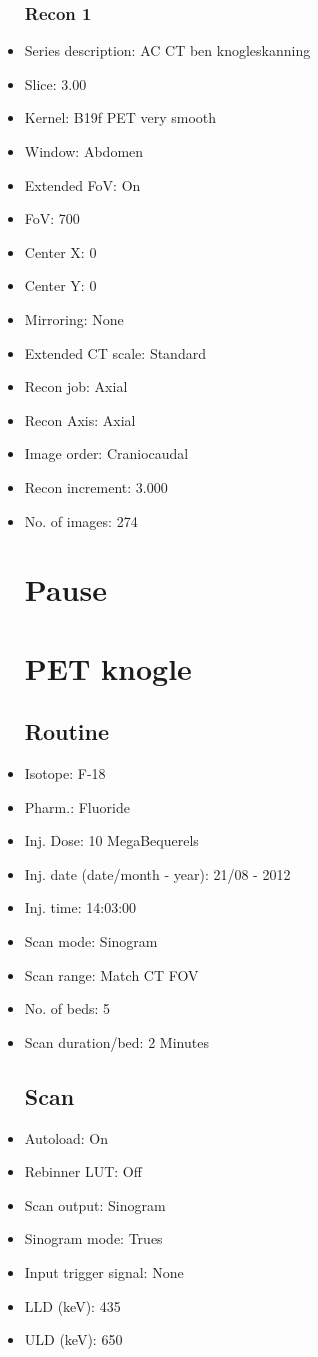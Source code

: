 \documentclass[12pt]{article}
\begin{document}
\begin{itemize}
\subsubsection{Recon 1}
\item Series description: AC CT  ben  knogleskanning
\item Slice: 3.00
\item Kernel: B19f PET very smooth
\item Window: Abdomen
\item Extended FoV: On
\item FoV: 700
\item Center X: 0
\item Center Y: 0
\item Mirroring: None
\item Extended CT scale: Standard
\item Recon job: Axial
\item Recon Axis: Axial
\item Image order: Craniocaudal
\item Recon increment: 3.000
\item No. of images: 274
\section{Pause}
\section{PET knogle}\subsection{Routine}
\item Isotope: F-18
\item Pharm.: Fluoride
\item Inj. Dose: 10 MegaBequerels
\item Inj. date (date/month - year): 21/08 - 2012
\item Inj. time: 14:03:00
\item Scan mode: Sinogram
\item Scan range: Match CT FOV
\item No. of beds: 5
\item Scan duration/bed: 2 Minutes
\subsection{Scan}
\item Autoload: On
\item Rebinner LUT: Off
\item Scan output: Sinogram
\item Sinogram mode: Trues
\item Input trigger signal: None
\item LLD (keV): 435
\item ULD (keV): 650

\end{itemize}
\end{document}
